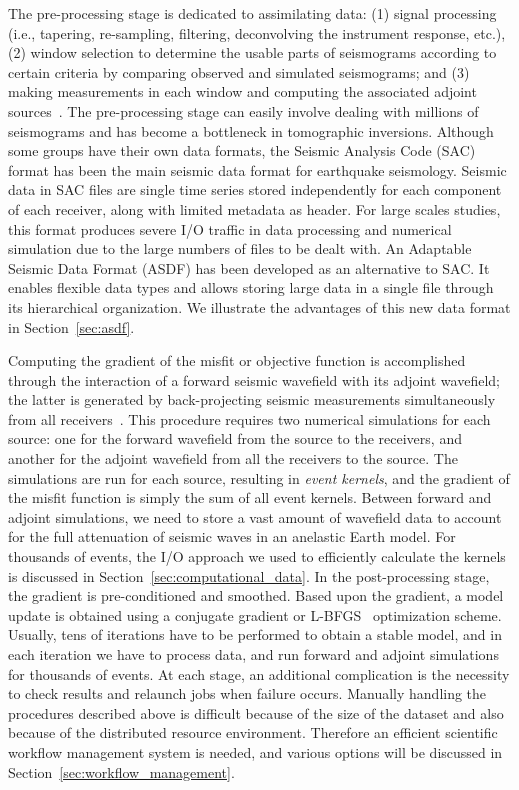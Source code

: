 The pre-processing stage is dedicated to assimilating data: (1) signal
processing (i.e., tapering, re-sampling, filtering, deconvolving the instrument
response, etc.), (2) window selection to determine the usable parts of
seismograms according to certain criteria by comparing observed and simulated
seismograms; and (3) making measurements in each window and computing
the associated adjoint sources~\cite{Tromp2005, tape2009adjoint, Zhu2009, Luo2013}. 
The pre-processing stage can easily involve dealing with millions of seismograms 
and has become a bottleneck in tomographic inversions.
Although some groups have their own data formats, the Seismic Analysis Code (SAC) format 
has been the main seismic data format for earthquake seismology. Seismic data
in SAC files are single time series stored independently for each component of each receiver, along with 
limited metadata as header. For large scales studies, this format produces
severe I/O traffic in data processing and numerical simulation due to the large
numbers of files to be dealt with.  
An Adaptable Seismic Data Format (ASDF) has been developed as an alternative 
to SAC\@. It enables flexible data types and allows storing large data in a single file 
through its hierarchical organization. We illustrate the advantages of this new data
format in Section~\ref{sec:asdf}.

Computing the gradient of the misfit or objective function is accomplished through
the interaction of a forward seismic
wavefield with its adjoint wavefield; the latter is generated by back-projecting
seismic measurements simultaneously from all receivers~\cite{Tar84}.
This procedure requires two numerical
simulations for each source: one for the forward wavefield from the source to
the receivers, and another for the adjoint wavefield from all the receivers to the
source. The simulations are run for each source, resulting in \emph{event kernels},
and the gradient of the misfit function is simply the sum of all event kernels.
Between forward and adjoint simulations, we need to store a vast amount of
wavefield data to account for the full attenuation of seismic waves in an anelastic
Earth model.  
For thousands of events, the I/O approach we used to efficiently
calculate the kernels is discussed in Section~\ref{sec:computational_data}.
In the post-processing stage, the gradient is pre-conditioned and
smoothed.  Based upon the gradient, a model update is obtained using a
conjugate gradient or L-BFGS~\cite{Nocedal1980} optimization scheme. Usually,
tens of iterations have to be performed to obtain a stable model, and in each iteration
we have to process data, and run forward and adjoint simulations for thousands of
events. At each stage, an additional complication is the necessity to check
results and relaunch jobs when failure occurs. Manually handling the procedures
described above is difficult because of the size of the dataset and also because of
the distributed resource environment.
Therefore an efficient scientific workflow
management system is needed, and various options will be discussed in
Section~\ref{sec:workflow_management}.
